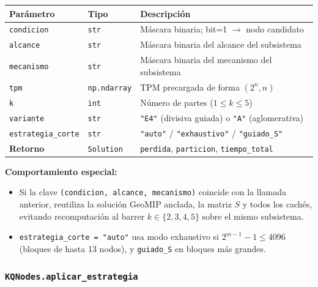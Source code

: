 \begin{table}[H]
\centering
\begin{tabular}{llp{5.5cm}}
  \toprule
  \textbf{Parámetro} & \textbf{Tipo} & \textbf{Descripción} \\
  \midrule
  \texttt{condicion}         & \texttt{str}        & Máscara binaria; bit=1 $\to$ nodo candidato \\
  \texttt{alcance}           & \texttt{str}        & Máscara binaria del alcance del subsistema \\
  \texttt{mecanismo}         & \texttt{str}        & Máscara binaria del mecanismo del subsistema \\
  \texttt{tpm}               & \texttt{np.ndarray} & TPM precargada de forma $(2^n, n)$ \\
  \texttt{k}                 & \texttt{int}        & Número de partes ($1 \le k \le 5$) \\
  \texttt{variante}          & \texttt{str}        & \texttt{"E4"} (divisiva guiada) o \texttt{"A"} (aglomerativa) \\
  \texttt{estrategia\_corte} & \texttt{str}        & \texttt{"auto"} / \texttt{"exhaustivo"} / \texttt{"guiado\_S"} \\
  \midrule
  \textbf{Retorno}           & \texttt{Solution}   & \texttt{perdida}, \texttt{particion}, \texttt{tiempo\_total} \\
  \bottomrule
\end{tabular}
\end{table}

\textbf{Comportamiento especial:}
\begin{itemize}
  \item Si la clave \texttt{(condicion, alcance, mecanismo)} coincide con la
        llamada anterior, reutiliza la solución GeoMIP anclada, la matriz $S$
        y todos los cachés, evitando recomputación al barrer
        $k \in \{2,3,4,5\}$ sobre el mismo subsistema.
  \item \texttt{estrategia\_corte = "auto"} usa modo exhaustivo si
        $2^{m-1}-1 \le 4096$ (bloques de hasta 13 nodos), y
        \texttt{guiado\_S} en bloques más grandes.
\end{itemize}

\subsubsection*{\texttt{KQNodes.aplicar\_estrategia}}

